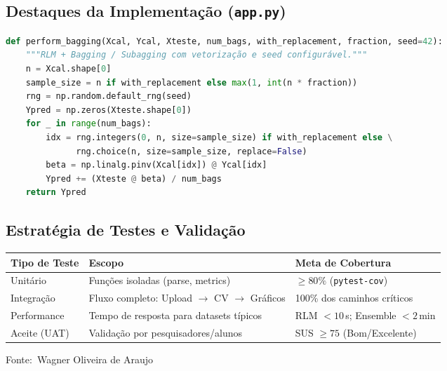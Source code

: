 \documentclass[12pt,a4paper]{article}
\newcommand{\oautor}{Wagner Oliveira de Araujo}
\begin{document}
\subsection{Destaques da Implementação (\texttt{app.py})}
\begin{lstlisting}[language=Python]
def perform_bagging(Xcal, Ycal, Xteste, num_bags, with_replacement, fraction, seed=42):
    """RLM + Bagging / Subagging com vetorização e seed configurável."""
    n = Xcal.shape[0]
    sample_size = n if with_replacement else max(1, int(n * fraction))
    rng = np.random.default_rng(seed)
    Ypred = np.zeros(Xteste.shape[0])
    for _ in range(num_bags):
        idx = rng.integers(0, n, size=sample_size) if with_replacement else \
              rng.choice(n, size=sample_size, replace=False)
        beta = np.linalg.pinv(Xcal[idx]) @ Ycal[idx]
        Ypred += (Xteste @ beta) / num_bags
    return Ypred
\end{lstlisting}

\subsection{Estratégia de Testes e Validação}

\begin{quadro}[ht]
\begin{center}
\small
\caption{Estratégia de testes e critérios de aceite}
\label{quadro:testes}
\begin{threeparttable}
\begin{tabularx}{\textwidth}{|l|X|X|} \hline
\textbf{Tipo de Teste} & \textbf{Escopo} & \textbf{Meta de Cobertura} \\ \hline
Unitário & Funções isoladas (parse, metrics) & $\ge 80\%$ (\texttt{pytest-cov}) \\ \hline
Integração & Fluxo completo: Upload $\rightarrow$ CV $\rightarrow$ Gráficos & 100\% dos caminhos críticos \\ \hline
Performance & Tempo de resposta para datasets típicos & RLM $< 10\,$s; Ensemble $< 2\,$min \\ \hline
Aceite (UAT) & Validação por pesquisadores/alunos & SUS $\ge 75$ (Bom/Excelente) \\ \hline
\end{tabularx}
\begin{tablenotes}[flushleft]
\footnotesize
\item Fonte:~\oautor
\end{tablenotes}
\end{threeparttable}
\end{center}
\end{quadro}
\end{document}
